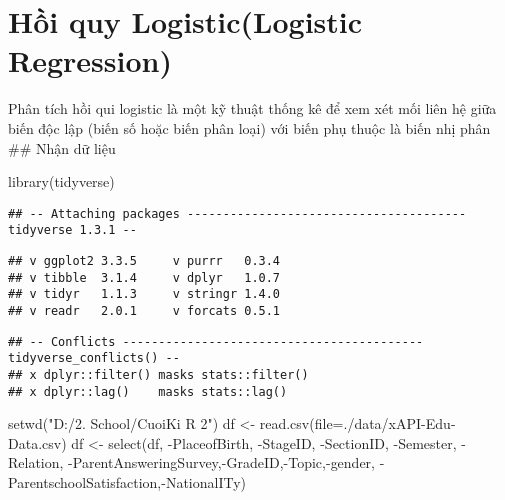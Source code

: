 \documentclass[
]{article}
\author{}
\date{\vspace{-2.5em}}
\newenvironment{Shaded}{\begin{snugshade}}{\end{snugshade}}
\newcommand{\AttributeTok}[1]{\textcolor[rgb]{0.77,0.63,0.00}{#1}}
\newcommand{\FunctionTok}[1]{\textcolor[rgb]{0.00,0.00,0.00}{#1}}
\newcommand{\NormalTok}[1]{#1}
\newcommand{\OtherTok}[1]{\textcolor[rgb]{0.56,0.35,0.01}{#1}}
\newcommand{\SpecialCharTok}[1]{\textcolor[rgb]{0.00,0.00,0.00}{#1}}
\newcommand{\StringTok}[1]{\textcolor[rgb]{0.31,0.60,0.02}{#1}}
\begin{document}
\hypertarget{hux1ed3i-quy-logisticlogistic-regression}{%
\section{Hồi quy Logistic(Logistic
Regression)}\label{hux1ed3i-quy-logisticlogistic-regression}}

Phân tích hồi qui logistic là một kỹ thuật thống kê để xem xét mối liên
hệ giữa biến độc lập (biến số hoặc biến phân loại) với biến phụ thuộc là
biến nhị phân \#\# Nhận dữ liệu

\begin{Shaded}
\begin{Highlighting}[]
\FunctionTok{library}\NormalTok{(tidyverse)}
\end{Highlighting}
\end{Shaded}

\begin{verbatim}
## -- Attaching packages --------------------------------------- tidyverse 1.3.1 --
\end{verbatim}

\begin{verbatim}
## v ggplot2 3.3.5     v purrr   0.3.4
## v tibble  3.1.4     v dplyr   1.0.7
## v tidyr   1.1.3     v stringr 1.4.0
## v readr   2.0.1     v forcats 0.5.1
\end{verbatim}

\begin{verbatim}
## -- Conflicts ------------------------------------------ tidyverse_conflicts() --
## x dplyr::filter() masks stats::filter()
## x dplyr::lag()    masks stats::lag()
\end{verbatim}

\begin{Shaded}
\begin{Highlighting}[]
\FunctionTok{setwd}\NormalTok{(}\StringTok{"D:/2. School/CuoiKi R 2"}\NormalTok{)}
\NormalTok{df }\OtherTok{\textless{}{-}} \FunctionTok{read.csv}\NormalTok{(}\AttributeTok{file=}\StringTok{\textquotesingle{}./data/xAPI{-}Edu{-}Data.csv\textquotesingle{}}\NormalTok{)}
\NormalTok{df }\OtherTok{\textless{}{-}} \FunctionTok{select}\NormalTok{(df, }\SpecialCharTok{{-}}\NormalTok{PlaceofBirth, }\SpecialCharTok{{-}}\NormalTok{StageID, }\SpecialCharTok{{-}}\NormalTok{SectionID, }\SpecialCharTok{{-}}\NormalTok{Semester, }\SpecialCharTok{{-}}\NormalTok{Relation, }\SpecialCharTok{{-}}\NormalTok{ParentAnsweringSurvey,}\SpecialCharTok{{-}}\NormalTok{GradeID,}\SpecialCharTok{{-}}\NormalTok{Topic,}\SpecialCharTok{{-}}\NormalTok{gender,  }\SpecialCharTok{{-}}\NormalTok{ParentschoolSatisfaction,}\SpecialCharTok{{-}}\NormalTok{NationalITy)}
\end{Highlighting}
\end{Shaded}
\end{document}
